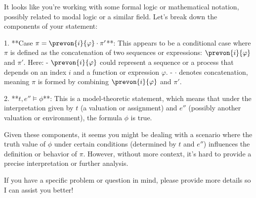 It looks like you're working with some formal logic or mathematical notation, possibly related to modal logic or a similar field. Let's break down the components of your statement:

1. **Case $\pi=\prevon{i}{\varphi}\cdot\pi'$**: This appears to be a conditional case where $\pi$ is defined as the concatenation of two sequences or expressions: $\prevon{i}{\varphi}$ and $\pi'$. Here:
   - $\prevon{i}{\varphi}$ could represent a sequence or a process that depends on an index $i$ and a function or expression $\varphi$.
   - $\cdot$ denotes concatenation, meaning $\pi$ is formed by combining $\prevon{i}{\varphi}$ and $\pi'$.

2. **$t,e'' \models \phi$**: This is a model-theoretic statement, which means that under the interpretation given by $t$ (a valuation or assignment) and $e''$ (possibly another valuation or environment), the formula $\phi$ is true.

Given these components, it seems you might be dealing with a scenario where the truth value of $\phi$ under certain conditions (determined by $t$ and $e''$) influences the definition or behavior of $\pi$. However, without more context, it's hard to provide a precise interpretation or further analysis.

If you have a specific problem or question in mind, please provide more details so I can assist you better!